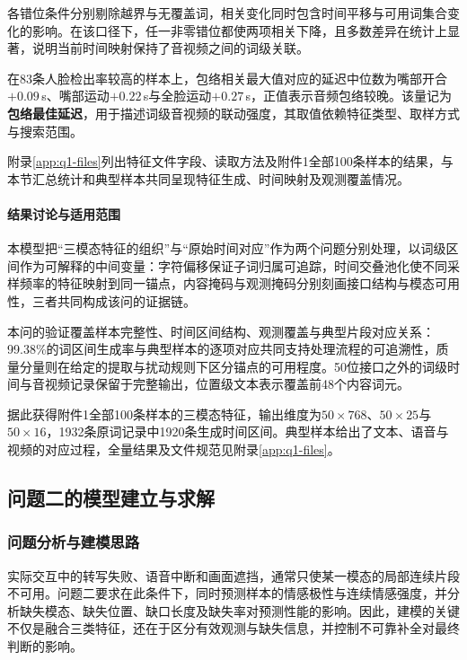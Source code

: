 各错位条件分别剔除越界与无覆盖词，相关变化同时包含时间平移与可用词集合变化的影响。在该口径下，任一非零错位都使两项相关下降，且多数差异在统计上显著，说明当前时间映射保持了音视频之间的词级关联。

在83条人脸检出率较高的样本上，包络相关最大值对应的延迟中位数为嘴部开合$+0.09$\,s、嘴部运动$+0.22$\,s与全脸运动$+0.27$\,s，正值表示音频包络较晚。该量记为\textbf{包络最佳延迟}，用于描述词级音视频的联动强度，其取值依赖特征类型、取样方式与搜索范围。

附录\ref{app:q1-files}列出特征文件字段、读取方法及附件1全部100条样本的结果，与本节汇总统计和典型样本共同呈现特征生成、时间映射及观测覆盖情况。

\paragraph{结果讨论与适用范围}

本模型把“三模态特征的组织”与“原始时间对应”作为两个问题分别处理，以词级区间作为可解释的中间变量：字符偏移保证子词归属可追踪，时间交叠池化使不同采样频率的特征映射到同一锚点，内容掩码与观测掩码分别刻画接口结构与模态可用性，三者共同构成该问的证据链。

本问的验证覆盖样本完整性、时间区间结构、观测覆盖与典型片段对应关系：99.38\%的词区间生成率与典型样本的逐项对应共同支持处理流程的可追溯性，质量分量则在给定的提取与扰动规则下区分锚点的可用程度。50位接口之外的词级时间与音视频记录保留于完整输出，位置级文本表示覆盖前48个内容词元。

据此获得附件1全部100条样本的三模态特征，输出维度为$50\times768$、$50\times25$与$50\times16$，1932条原词记录中1920条生成时间区间。典型样本给出了文本、语音与视频的对应过程，全量结果及文件规范见附录\ref{app:q1-files}。

\FloatBarrier


\subsection{问题二的模型建立与求解}
\label{sec:q2}

\subsubsection{问题分析与建模思路}
实际交互中的转写失败、语音中断和画面遮挡，通常只使某一模态的局部连续片段不可用。问题二要求在此条件下，同时预测样本的情感极性与连续情感强度，并分析缺失模态、缺失位置、缺口长度及缺失率对预测性能的影响。因此，建模的关键不仅是融合三类特征，还在于区分有效观测与缺失信息，并控制不可靠补全对最终判断的影响。

